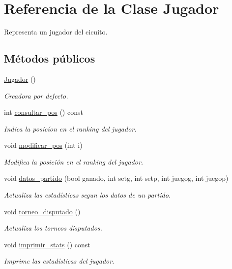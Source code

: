 \hypertarget{class_jugador}{}\section{Referencia de la Clase Jugador}
\label{class_jugador}


Representa un jugador del cicuito.  


\subsection*{Métodos públicos}
\begin{DoxyCompactItemize}
\item 
\hyperlink{class_jugador_a232c46f75691af6210096e5972535d71}{Jugador} ()
\begin{DoxyCompactList}\small\item\em Creadora por defecto. \end{DoxyCompactList}\item 
int \hyperlink{class_jugador_a69ab40db4a82c1b656895631b9949cbc}{consultar\+\_\+pos} () const
\begin{DoxyCompactList}\small\item\em Indica la posicíon en el ranking del jugador. \end{DoxyCompactList}\item 
void \hyperlink{class_jugador_af77bc217af6013d9e57cab34dd03921c}{modificar\+\_\+pos} (int i)
\begin{DoxyCompactList}\small\item\em Modifica la posición en el ranking del jugador. \end{DoxyCompactList}\item 
void \hyperlink{class_jugador_a241e7729a48da6c6d94ef51326a45a18}{datos\+\_\+partido} (bool ganado, int setg, int setp, int juegog, int juegop)
\begin{DoxyCompactList}\small\item\em Actualiza las estadísticas segun los datos de un partido. \end{DoxyCompactList}\item 
void \hyperlink{class_jugador_a5e1cd15a764a285556e35257209a2c8c}{torneo\+\_\+disputado} ()
\begin{DoxyCompactList}\small\item\em Actualiza los torneos disputados. \end{DoxyCompactList}\item 
void \hyperlink{class_jugador_a8bd81b77ba3d2e46bee69ea2f628f00d}{imprimir\+\_\+stats} () const
\begin{DoxyCompactList}\small\item\em Imprime las estadísticas del jugador. \end{DoxyCompactList}\end{DoxyCompactItemize}
